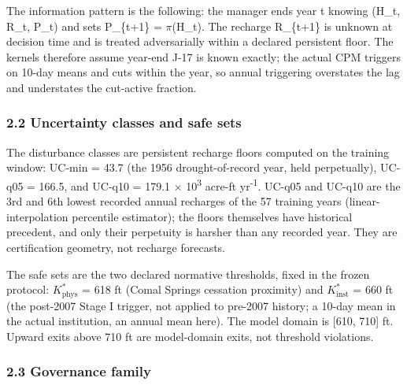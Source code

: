 \documentclass[11pt]{article}
\begin{document}
The information pattern is the following: the manager ends year t
knowing (H\_t, R\_t, P\_t) and sets P\_\{t+1\} = \ensuremath{\pi}(H\_t). The recharge
R\_\{t+1\} is unknown at decision time and is treated adversarially
within a declared persistent floor. The kernels therefore assume
year-end J-17 is known exactly; the actual CPM triggers on 10-day means
and cuts within the year, so annual triggering overstates the lag and
understates the cut-active fraction.

\subsubsection{2.2 Uncertainty classes and safe
sets}\label{uncertainty-classes-and-safe-sets}

The disturbance classes are persistent recharge floors computed on the
training window: UC-min = 43.7 (the 1956 drought-of-record year, held
perpetually), UC-q05 = 166.5, and UC-q10 = 179.1 \ensuremath{\times} 10\textsuperscript{3} acre-ft yr\textsuperscript{-1}.
UC-q05 and UC-q10 are the 3rd and 6th lowest recorded annual recharges
of the 57 training years (linear-interpolation percentile estimator);
the floors themselves have historical precedent, and only their
perpetuity is harsher than any recorded year. They are certification
geometry, not recharge forecasts.

The safe sets are the two declared normative thresholds, fixed in the
frozen protocol: \(K^{\ast}_{\mathrm{phys}}\) = 618 ft (Comal Springs
cessation proximity) and \(K^{\ast}_{\mathrm{inst}}\) = 660 ft (the
post-2007 Stage I trigger, not applied to pre-2007 history; a 10-day
mean in the actual institution, an annual mean here). The model domain
is {[}610, 710{]} ft. Upward exits above 710 ft are model-domain exits,
not threshold violations.

\subsubsection{2.3 Governance family}\label{governance-family}
\end{document}
